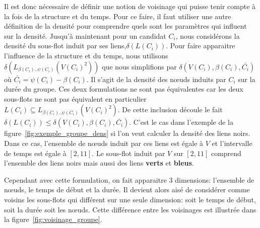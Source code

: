 Il est donc nécessaire de définir une notion de voisinage qui puisse tenir compte à la fois de la structure et du temps.
Pour ce faire, il faut utiliser une autre définition de la densité pour comprendre quels sont les paramètres qui influent sur la densité.
Jusqu'à maintenant pour un candidat $C_i$, nous considérons la densité du sous-flot induit par ses liens,$\delta(L(C_i))$.
Pour faire apparaitre l'influence de la structure et du temps, nous utilisons $\delta(L_{\beta(C_i)..\psi(C_i)}(V(C_i)^2))$ que nous simplifions par $\delta(V(C_i),\beta(C_i), \bar{C_i})$ où $\bar{C_i} = \psi(C_i)-\beta(C_i)$.
Il s'agit de la densité des n\oe uds induits par $C_i$ sur la durée du groupe.
Ces deux formulations ne sont pas équivalentes car les deux sous-flots ne sont pas équivalent en particulier $L(C_i) \subseteq L_{\beta(C_i)..\psi(C_i)}(V(C_i)^2)$.
De cette inclusion découle le fait $\delta(L(C_i)) \leq \delta(V(C_i),\beta(C_i), \bar{C_i})$.
C'est le cas dans l'exemple de la figure~\ref{fig:exemple_groupe_dens} si l'on veut calculer la densité des liens noirs.
Dans ce cas, l'ensemble de n\oe uds induit par ces liens est égale à $V$ et l'intervalle de temps est égale à $[2,11]$.
Le sous-flot induit par $V$ sur $[2,11]$ comprend l'ensemble des liens noirs mais aussi des liens \textcolor{vert_turquoise}{\textbf{verts}} et \textcolor{bleu_window}{\textbf{bleus}}.


Cependant avec cette formulation, on fait apparaitre 3 dimensions: l'ensemble de n\oe uds, le temps de début et la durée.
Il devient alors aisé de considérer comme voisins les sous-flots qui différent sur une seule dimension: soit le temps de début, soit la durée soit les n\oe uds.
Cette différence entre les voisinages est illustrée dans la figure~\ref{fig:voisinage_groupe}.

